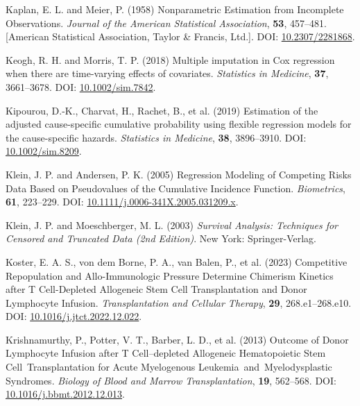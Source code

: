 \documentclass[
  letterpaper,
  DIV=11,
  numbers=noendperiod]{scrreprt}
\newlength{\cslhangindent}
\newlength{\cslentryspacingunit} %
\newenvironment{CSLReferences}[2] %
 {%
  \setlength{\parindent}{0pt}
  \ifodd #1
  \let\oldpar\par
  \def\par{\hangindent=\cslhangindent\oldpar}
  \fi
  \setlength{\parskip}{#2\cslentryspacingunit}
 }%
 {}
\begin{document}
\begin{CSLReferences}{1}{0}
\leavevmode{}%
Kaplan, E. L. and Meier, P. (1958) Nonparametric {Estimation} from
{Incomplete Observations}. \emph{Journal of the American Statistical
Association}, \textbf{53}, 457--481. {[}American Statistical
Association, Taylor \& Francis, Ltd.{]}. DOI:
\href{https://doi.org/10.2307/2281868}{10.2307/2281868}.

\leavevmode{}%
Keogh, R. H. and Morris, T. P. (2018) Multiple imputation in {Cox}
regression when there are time-varying effects of covariates.
\emph{Statistics in Medicine}, \textbf{37}, 3661--3678. DOI:
\href{https://doi.org/10.1002/sim.7842}{10.1002/sim.7842}.

\leavevmode{}%
Kipourou, D.-K., Charvat, H., Rachet, B., et al. (2019) Estimation of
the adjusted cause-specific cumulative probability using flexible
regression models for the cause-specific hazards. \emph{Statistics in
Medicine}, \textbf{38}, 3896--3910. DOI:
\href{https://doi.org/10.1002/sim.8209}{10.1002/sim.8209}.

\leavevmode{}%
Klein, J. P. and Andersen, P. K. (2005) Regression {Modeling} of
{Competing Risks Data Based} on {Pseudovalues} of the {Cumulative
Incidence Function}. \emph{Biometrics}, \textbf{61}, 223--229. DOI:
\href{https://doi.org/10.1111/j.0006-341X.2005.031209.x}{10.1111/j.0006-341X.2005.031209.x}.

\leavevmode{}%
Klein, J. P. and Moeschberger, M. L. (2003) \emph{Survival Analysis:
{Techniques} for Censored and Truncated Data (2nd Edition)}. New York:
Springer-Verlag.

\leavevmode{}%
Koster, E. A. S., von dem Borne, P. A., van Balen, P., et al. (2023)
Competitive {Repopulation} and {Allo-Immunologic Pressure Determine
Chimerism Kinetics} after {T Cell-Depleted Allogeneic Stem Cell
Transplantation} and {Donor Lymphocyte Infusion}. \emph{Transplantation
and Cellular Therapy}, \textbf{29}, 268.e1--268.e10. DOI:
\href{https://doi.org/10.1016/j.jtct.2022.12.022}{10.1016/j.jtct.2022.12.022}.

\leavevmode{}%
Krishnamurthy, P., Potter, V. T., Barber, L. D., et al. (2013) Outcome
of {Donor Lymphocyte Infusion} after {T Cell}--depleted {Allogeneic
Hematopoietic Stem Cell~Transplantation} for {Acute Myelogenous
Leukemia}~and~{Myelodysplastic Syndromes}. \emph{Biology of Blood and
Marrow Transplantation}, \textbf{19}, 562--568. DOI:
\href{https://doi.org/10.1016/j.bbmt.2012.12.013}{10.1016/j.bbmt.2012.12.013}.


\end{CSLReferences}
\end{document}

